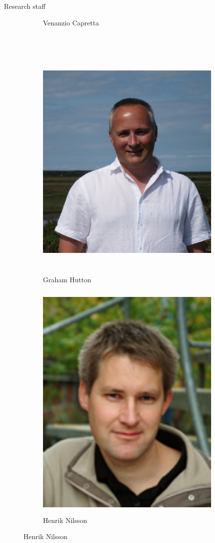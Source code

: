 \documentclass[final]{beamer}
\newlength{\threecolwid}
\begin{document}
\begin{frame}[t]
\begin{columns}[t]
\begin{column}{\threecolwid}
\begin{block}{Research staff}
\begin{figure}
\begin{subfigure}[b]{0.2\textwidth}
                \caption*{Venanzio Capretta}
        \end{subfigure}
        ~ %
        \begin{subfigure}[b]{0.2\textwidth}
                \centering
                \includegraphics[height=12cm]{hutton2.jpg}
                \caption*{Graham Hutton}
        \end{subfigure}
        \begin{subfigure}[b]{0.2\textwidth}
                \centering
                \includegraphics[height=12cm]{henriknilsson.jpg}
                \caption*{Henrik Nilsson}
        \end{subfigure}
\end{figure}
\end{block}


\end{column}
\end{columns}
\end{frame}
\end{document}
